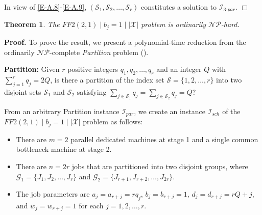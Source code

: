 \documentclass[12pt, eqno, limlimits]{article}
\newtheorem{theorem}{Theorem}[section]
\newtheorem{rem}{Remark}[section]
\begin{document}
\begin{sloppypar}
        In view of \eqref{E-A.8}-\eqref{E-A.9}, $(\mathcal{S}_1, \mathcal{S}_2, \ldots, \mathcal{S}_r)$ constitutes a solution to $\mathcal{I}_{3\text{-}par}$.  \hfill$\Box$\\
        
        
        
        
        \begin{theorem} \label{T-4.2}
            The $FF2(2, 1) \mid b_j=1 \mid |\mathcal{X}|$ problem is ordinarily $\mathcal{NP}$-hard.
        \end{theorem}
        
        \noindent \textbf{Proof.} To prove the result, we present a polynomial-time reduction from the ordinarily  $\mathcal{NP}$-complete \emph{Partition} problem (\citealp{Garey1979computer}).
        
        \textbf{Partition:} Given $r$ positive integers $q_1, q_2, \ldots, q_r$ and an integer $Q$ with $\sum_{j=1}^r q_j=2Q$, is there a partition of the index set $\mathcal{S}=\{1, 2, \ldots, r\}$ into two disjoint sets $\mathcal{S}_1$ and $\mathcal{S}_2$ satisfying $\sum_{j \in \mathcal{S}_1} q_j = \sum_{j \in \mathcal{S}_2} q_j=Q$?
        
        From an arbitrary Partition instance $\mathcal{I}_{par}$, we create an instance $\mathcal{I}_{sch}$ of the $FF2(2, 1) \mid b_j=1 \mid |\mathcal{X}|$ problem  as follows: 
        \begin{itemize}
            \item There are $m=2$ parallel dedicated machines at stage 1 and a single common bottleneck machine at stage 2. 
            
            \item There are $n=2r$ jobs that are partitioned into two disjoint groups, where $\mathcal{G}_1=\{J_1, J_2, \ldots, J_r\}$ and $\mathcal{G}_2=\{J_{r+1}, J_{r+2}, \ldots, J_{2r}\}$.
            
            \item The job parameters are $a_j=a_{r+j}=r q_j$, $b_j=b_{r+j}=1$, $d_j=d_{r+j}=rQ+j$, and $w_j=w_{r+j}=1$ for each $j=1, 2, \ldots, r$.
            

\end{itemize}
\end{sloppypar}
\end{document}
